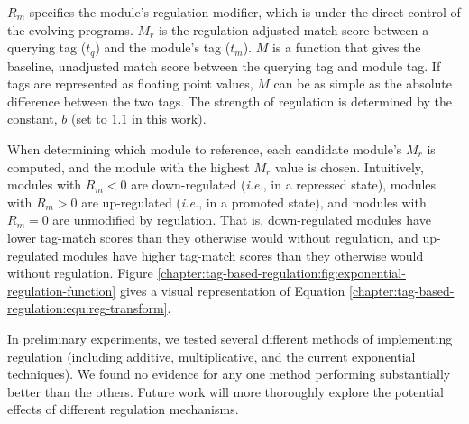 \noindent
$R_m$ specifies the module's regulation modifier, which is under the direct control of the evolving programs.
$M_r$ is the regulation-adjusted match score between a querying tag ($t_q$) and the module's tag ($t_m$).
$M$ is a function that gives the baseline, unadjusted match score between the querying tag and module tag.
If tags are represented as floating point values, $M$ can be as simple as the absolute difference between the two tags.
The strength of regulation is determined by the constant, $b$ (set to $1.1$ in this work). 



When determining which module to reference, each candidate module's $M_r$ is computed, and the module with the highest $M_r$ value is chosen. 
Intuitively, modules with $R_m < 0$ are down-regulated (\textit{i.e.}, in a repressed state), modules with $R_m > 0$ are up-regulated (\textit{i.e.}, in a promoted state), and modules with $R_m = 0$ are unmodified by regulation. 
That is, down-regulated modules have lower tag-match scores than they otherwise would without regulation, and up-regulated modules have higher tag-match scores than they otherwise would without regulation.
Figure \ref{chapter:tag-based-regulation:fig:exponential-regulation-function} gives a visual representation of Equation \ref{chapter:tag-based-regulation:equ:reg-transform}.

In preliminary experiments, we tested several different methods of implementing regulation (including additive, multiplicative, and the current exponential techniques).
We found no evidence for any one method performing substantially better than the others.
Future work will more thoroughly explore the potential effects of different regulation mechanisms. 
